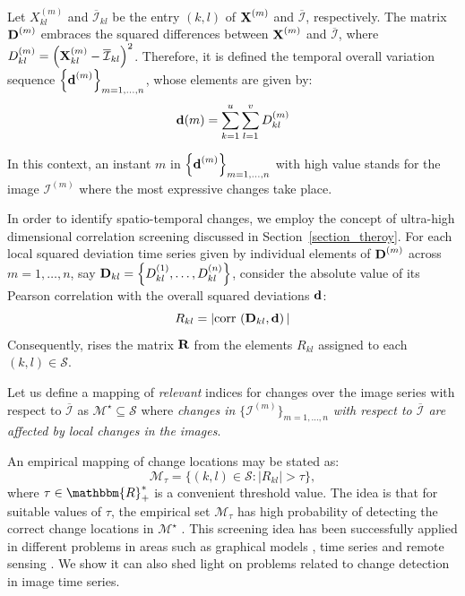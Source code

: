 \documentclass[journal]{IEEEtran}
\def\corr{\mbox{{\rm corr\,}}}
\newcommand{\vD}{{\textbf D}}
\newcommand{\vd}{{\textbf d}}
\newcommand{\vR}{{\textbf R}}
\newcommand{\vX}{{\textbf X}}
\begin{document}
Let $X_{kl}^{(m)}$ and $\overline{\mathcal{I}}_{kl}$ be the entry $(k,l)$ of $\vX^{(m)}$ and $\overline{\mathcal{I}}$, respectively. 
%
The matrix $\vD^{(m)}$ embraces the squared differences between $\vX^{(m)}$ and $\overline{\mathcal{I}}$, where $D_{kl}^{(m)} = \left( \vX_{kl}^{(m)} - \overline{\mathcal{I}}_{kl} \right)^2$.
%
Therefore, it is defined the temporal overall variation sequence $\left\lbrace \vd^{(m)}  \right\rbrace_{m=1,\ldots,n}$, whose elements are given by:
\begin{equation}\label{E:eq_defdm}
\vd(m)= \sum_{k=1}^{u} \sum_{l=1}^{v} D_{kl}^{(m)} %
\end{equation}


In this context, an instant $m$ in $\left\lbrace \vd^{(m)}  \right\rbrace_{m=1,\ldots,n}$ with high value stands for the image $\mathcal{I}^{(m)}$ where the most expressive changes take place.



In order to identify spatio-temporal changes, we employ the concept of ultra-high dimensional correlation screening \cite{fan2020statistical} discussed in Section~\ref{section_theroy}. For each local squared deviation time series given by individual elements of $\vD^{(m)}$ across $m=1,\ldots,n$, say $\vD_{kl} = \left\lbrace D_{kl}^{(1)},\ldots,D_{kl}^{(n)} \right\rbrace$, consider the absolute value of its Pearson correlation with the overall squared deviations $\vd$:
\begin{equation}\label{def_Rkld}
R_{kl}= |\corr \left( \vD_{kl}, \vd \right)|
\end{equation}
Consequently, rises the matrix $\vR$ from the elements $R_{kl}$ assigned to each $(k,l) \in \mathcal{S}$.




Let us define a mapping of \textit{relevant} indices for changes over the image series with respect to $\overline{\mathcal I}$ as $\mathcal{M}^{\star} \subseteq \mathcal{S}$ where \textit{changes in $\{\mathcal{I}^{(m)}\}_{m=1,\ldots,n}$ with respect to $\overline{\mathcal{I}}$ are affected by local changes in the images}.


An empirical mapping of change locations may be stated as:
\begin{equation}
\mathcal{M}_{\tau} = \{(k,l) \in \mathcal{S} : |R_{kl}|>\tau\},
\label{E:def_Mtaud}
\end{equation}
where $\tau \in \mathbbm{R}_{+}^{*}$ is a convenient threshold value. The idea is that for suitable values of $\tau$, the empirical set $\mathcal{M}_{\tau}$ has high probability of detecting the correct change locations in $\mathcal{M}^{\star}$ \cite{fan2020statistical}. This screening idea has been successfully applied in different problems in areas such as graphical models \cite{zheng2020uniform}, time series \cite{yousuf2021targeting} and remote sensing \cite{li2021mapping}. We show it can also shed light on problems related to change detection in image time series.
\end{document}
